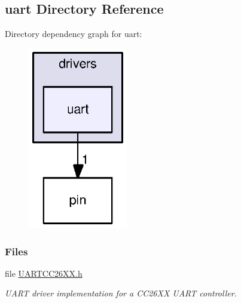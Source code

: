 \subsection{uart Directory Reference}
\label{dir_8e994894e801e8772accd8fda9d64bd1}
Directory dependency graph for uart\+:
\nopagebreak
\begin{figure}[H]
\begin{center}
\leavevmode
\includegraphics[width=123pt]{dir_8e994894e801e8772accd8fda9d64bd1_dep}
\end{center}
\end{figure}
\subsubsection*{Files}
\begin{DoxyCompactItemize}
\item 
file \hyperlink{_u_a_r_t_c_c26_x_x_8h}{U\+A\+R\+T\+C\+C26\+X\+X.\+h}
\begin{DoxyCompactList}\small\item\em U\+A\+R\+T driver implementation for a C\+C26\+X\+X U\+A\+R\+T controller. \end{DoxyCompactList}\end{DoxyCompactItemize}
